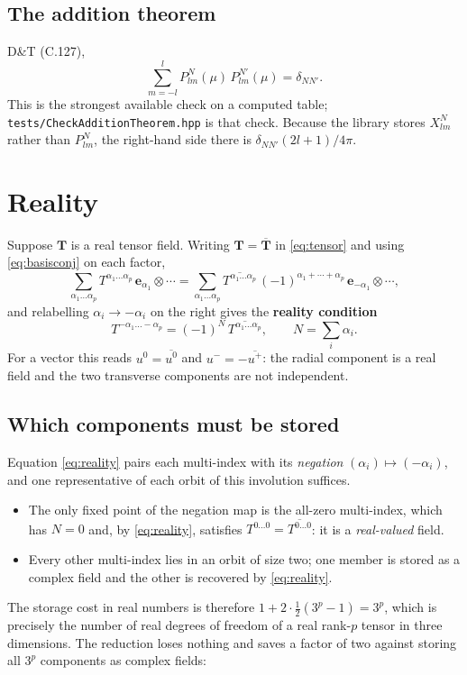 \documentclass[11pt,a4paper]{article}
\newcommand{\ebasis}[1]{\mathbf{e}_{#1}}
\newcommand{\conj}[1]{\overline{#1}}
\newcommand{\code}[1]{\texttt{#1}}
\begin{document}
\subsection{The addition theorem}

D\&T (C.127),
\begin{equation}
  \sum_{m=-l}^{l} P^{N}_{lm}(\mu)\, P^{N'}_{lm}(\mu) = \delta_{NN'}.
  \label{eq:addition}
\end{equation}
This is the strongest available check on a computed table;
\code{tests/CheckAdditionTheorem.hpp} is that check.  Because the library stores
$X^N_{lm}$ rather than $P^N_{lm}$, the right-hand side there is
$\delta_{NN'}(2l+1)/4\pi$.

\section{Reality}
\label{sec:reality}

Suppose $\mathbf{T}$ is a real tensor field.  Writing
$\mathbf{T} = \conj{\mathbf{T}}$ in \eqref{eq:tensor} and using
\eqref{eq:basisconj} on each factor,
\begin{equation}
  \sum_{\alpha_1 \ldots \alpha_p} T^{\alpha_1 \ldots \alpha_p}\,
    \ebasis{\alpha_1} \otimes \cdots
  = \sum_{\alpha_1 \ldots \alpha_p} \conj{T^{\alpha_1 \ldots \alpha_p}}\,
     (-1)^{\alpha_1 + \cdots + \alpha_p}\,
     \ebasis{-\alpha_1} \otimes \cdots ,
\end{equation}
and relabelling $\alpha_i \to -\alpha_i$ on the right gives the
\textbf{reality condition}
\begin{equation}
  T^{-\alpha_1\ldots-\alpha_p} = (-1)^{N}\,
    \conj{T^{\alpha_1\ldots\alpha_p}},
  \qquad N = \textstyle\sum_i \alpha_i .
  \label{eq:reality}
\end{equation}
For a vector this reads $u^0=\conj{u^0}$ and $u^-=-\conj{u^+}$: the radial
component is a real field and the two transverse components are not
independent.

\subsection{Which components must be stored}
\label{sec:orbits}

Equation \eqref{eq:reality} pairs each multi-index with its
\emph{negation} $(\alpha_i)\mapsto(-\alpha_i)$, and one representative of
each orbit of this involution suffices.
\begin{itemize}
  \item The only fixed point of the negation map is the all-zero
    multi-index, which has $N=0$ and, by \eqref{eq:reality}, satisfies
    $T^{0\ldots 0} = \conj{T^{0\ldots 0}}$: it is a \emph{real-valued}
    field.
  \item Every other multi-index lies in an orbit of size two; one member
    is stored as a complex field and the other is recovered by
    \eqref{eq:reality}.
\end{itemize}
The storage cost in real numbers is therefore
$1 + 2\cdot\tfrac{1}{2}(3^p-1) = 3^p$, which is precisely the number of
real degrees of freedom of a real rank-$p$ tensor in three dimensions.
The reduction loses nothing and saves a factor of two against storing all
$3^p$ components as complex fields:
\end{document}
